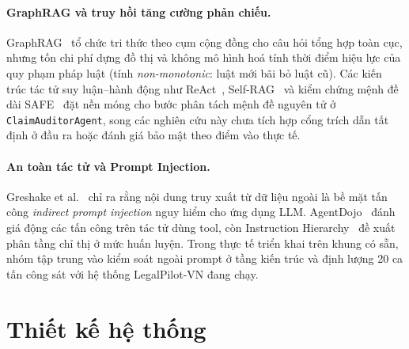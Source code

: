 \documentclass[sigconf,nonacm]{acmart}
\begin{document}
\paragraph{GraphRAG và truy hồi tăng cường phản chiếu.}
GraphRAG~\cite{edge2024graphrag} tổ chức tri thức theo cụm cộng đồng cho câu hỏi tổng hợp toàn cục, nhưng tốn chi phí dựng đồ thị và không mô hình hoá tính thời điểm hiệu lực của quy phạm pháp luật (tính \emph{non-monotonic}: luật mới bãi bỏ luật cũ). Các kiến trúc tác tử suy luận--hành động như ReAct~\cite{yao2023react}, Self-RAG~\cite{asai2024selfrag} và kiểm chứng mệnh đề dài SAFE~\cite{wei2024safe} đặt nền móng cho bước phân tách mệnh đề nguyên tử ở \texttt{ClaimAuditorAgent}, song các nghiên cứu này chưa tích hợp cổng trích dẫn tất định ở đầu ra hoặc đánh giá bảo mật theo điểm vào thực tế.

\paragraph{An toàn tác tử và Prompt Injection.}
Greshake et al.~\cite{greshake2023injection} chỉ ra rằng nội dung truy xuất từ dữ liệu ngoài là bề mặt tấn công \emph{indirect prompt injection} nguy hiểm cho ứng dụng LLM. AgentDojo~\cite{debenedetti2024injection} đánh giá động các tấn công trên tác tử dùng tool, còn Instruction Hierarchy~\cite{wallace2024instruction} đề xuất phân tầng chỉ thị ở mức huấn luyện. Trong thực tế triển khai trên khung có sẵn, nhóm tập trung vào kiểm soát ngoài prompt ở tầng kiến trúc và định lượng 20 ca tấn công sát với hệ thống LegalPilot-VN đang chạy.

\section{Thiết kế hệ thống}
\label{sec:design}
\end{document}
